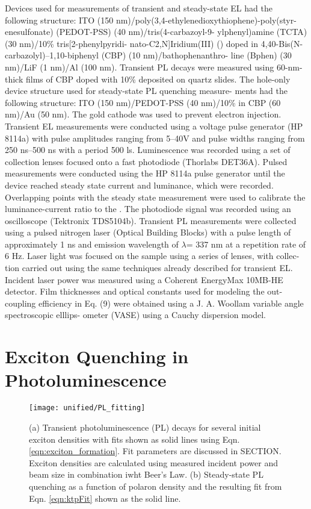 \documentclass[../thesis.tex]{subfiles}
\begin{document}
Devices used for measurements of transient and steady-state EL had the following structure: ITO (150 nm)/poly(3,4-ethylenedioxythiophene)-poly(styr- enesulfonate) (PEDOT-PSS) (40 nm)/tris(4-carbazoyl-9- ylphenyl)amine (TCTA) (30 nm)/10\% tris[2-phenylpyridi- nato-C2,N]Iridium(III) (\irppy) doped in 4,40-Bis(N- carbazolyl)–1,10-biphenyl (CBP) (10 nm)/bathophenanthro- line (Bphen) (30 nm)/LiF (1 nm)/Al (100 nm). 
Transient PL decays were measured using 60-nm-thick films of CBP doped with 10\% \irppy deposited on quartz slides. 
The hole-only device structure used for steady-state PL quenching measure- ments had the following structure: ITO (150 nm)/PEDOT-PSS (40 nm)/10\% \irppy in CBP (60 nm)/Au (50 nm). The gold cathode was used to prevent electron injection. 
Transient EL measurements were conducted using a voltage pulse generator (HP 8114a) with pulse amplitudes ranging from 5–40V and pulse widths ranging from 250 ns–500 ns with a period 500 ls. 
Luminescence was recorded using a set of collection lenses focused onto a fast photodiode (Thorlabs DET36A). 
Pulsed \eqe measurements were conducted using the HP 8114a pulse generator until the device reached steady state current and luminance, which were recorded.  
Overlapping points with the steady state \eqe measurement were used to calibrate the luminance-current ratio to the \eqe.
The photodiode signal was recorded using an oscilloscope (Tektronix TDS5104b). 
Transient PL measurements were collected using a
pulsed nitrogen laser (Optical Building Blocks) with a pulse length of approximately 1 ns and emission wavelength of $\lambda$= 337 nm at a repetition rate of 6 Hz. Laser light was focused on the sample using a series of lenses, with collec- tion carried out using the same techniques already described for transient EL. 
Incident laser power was measured using a Coherent EnergyMax 10MB-HE detector. 
Film thicknesses and optical constants used for modeling the out-coupling efficiency in Eq. (9) were obtained using a J. A. Woollam variable angle spectroscopic elllips- ometer (VASE) using a Cauchy dispersion model.



\section{Exciton Quenching in Photoluminescence}\label{sec:pl_measurements}

\begin{wrapfigure}{R}{0.5\textwidth}
\centering
\texttt{[image: unified/PL\_fitting]}
\caption{(a) Transient photoluminescence (PL) decays for several initial exciton densities with fits shown as solid lines using Eqn. \ref{eqn:exciton_formation}.  Fit parameters are discussed in SECTION.  Exciton densities are calculated using measured incident power and beam size in combination iwht Beer's Law.  (b) Steady-state PL quenching as a function of polaron density and the resulting fit from Eqn. \ref{eqn:ktpFit} shown as the solid line.}
\label{fig:PL_fitting}
\end{wrapfigure}
\end{document}
